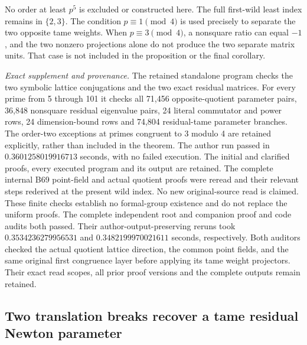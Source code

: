 \begin{remark}
\label{rem:B-RD83-scope}
No order at least \(p^5\) is excluded or constructed here.
The full first-wild least index remains in \(\{2,3\}\).
The condition \(p\equiv1\pmod4\) is used precisely to
separate the two opposite tame weights. When
\(p\equiv3\pmod4\), a nonsquare ratio can equal \(-1\),
and the two nonzero projections alone do not produce the
two separate matrix units. That case is not included in
the proposition or the final corollary.

\smallskip
\noindent\emph{Exact supplement and provenance.}
The retained standalone program
checks the two symbolic lattice conjugations and the two
exact residual matrices. For every prime from 5 through 101
it checks all 71,456 opposite-quotient parameter pairs,
36,848 nonsquare residual eigenvalue pairs, 24 literal
commutator and power rows, 24 dimension-bound rows and
74,804 residual-tame parameter branches. The order-two
exceptions at primes congruent to 3 modulo 4 are retained
explicitly, rather than included in the theorem.
The author run passed in \(0.3601258019916713\) seconds,
with no failed execution. The initial and clarified proofs,
every executed program and its output are retained. The
complete internal B69 point-field and actual quotient
proofs were reread and their relevant steps rederived
at the present wild index. No new original-source read
is claimed. These finite checks establish no formal-group
existence and do not replace the uniform proofs.
The complete independent root and companion proof and code
audits both passed. Their author-output-preserving reruns
took \(0.3534236279956531\) and
\(0.3482199970021611\) seconds, respectively. Both
auditors checked the actual quotient lattice direction,
the common point fields, and the same original first
congruence layer before applying its tame weight
projectors. Their exact read scopes, all prior proof
versions and the complete outputs remain retained.
\end{remark}


\subsection{Two translation breaks recover a tame residual Newton parameter}

